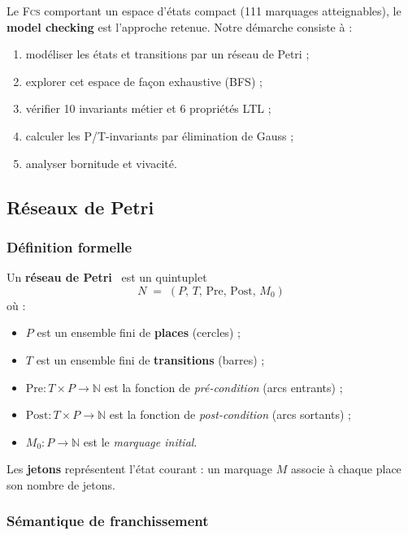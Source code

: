 \documentclass[11pt,a4paper]{article}
\newcommand{\fcs}{\textsc{Fcs}\xspace}
\begin{document}
Le \fcs comportant un espace d'états compact (111 marquages atteignables), le
\textbf{model checking} est l'approche retenue. Notre démarche consiste à :

\begin{enumerate}[leftmargin=1.2cm,itemsep=2pt]
  \item modéliser les états et transitions par un réseau de Petri ;
  \item explorer cet espace de façon exhaustive (BFS) ;
  \item vérifier 10 invariants métier et 6 propriétés LTL ;
  \item calculer les P/T-invariants par élimination de Gauss ;
  \item analyser bornitude et vivacité.
\end{enumerate}

\subsection{Réseaux de Petri}

\subsubsection{Définition formelle}

Un \textbf{réseau de Petri}~\cite{petri1962} est un quintuplet
\[
N \;=\; (P,\, T,\, \mathrm{Pre},\, \mathrm{Post},\, M_0)
\]
où :
\begin{itemize}[leftmargin=1.2cm,itemsep=2pt]
  \item $P$ est un ensemble fini de \textbf{places} (cercles) ;
  \item $T$ est un ensemble fini de \textbf{transitions} (barres) ;
  \item $\mathrm{Pre} : T \times P \to \mathbb{N}$ est la fonction de
        \emph{pré-condition} (arcs entrants) ;
  \item $\mathrm{Post} : T \times P \to \mathbb{N}$ est la fonction de
        \emph{post-condition} (arcs sortants) ;
  \item $M_0 : P \to \mathbb{N}$ est le \emph{marquage initial}.
\end{itemize}

Les \textbf{jetons} représentent l'état courant : un marquage $M$ associe à
chaque place son nombre de jetons.

\subsubsection{Sémantique de franchissement}
\end{document}

